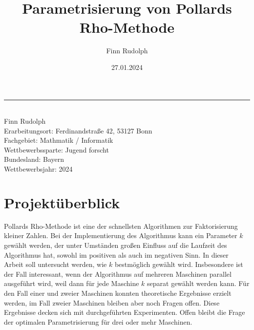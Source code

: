 \documentclass[a4paper, 10pt, ngerman]{article}
\title{Parametrisierung von Pollards Rho-Methode}
\author{Finn Rudolph}
\date{27.01.2024}
\begin{document}
\begin{titlepage}

    \noindent\rule{\textwidth}{0.4pt}

    \makeatletter
    \begin{flushleft}
        \textbf{\LARGE{\@title}} \\
        \vspace{1.5em}
        Finn Rudolph \\
        \vspace{1em}
        Erarbeitungsort: Ferdinandstraße 42, 53127 Bonn \\
        Fachgebiet: Mathmatik / Informatik \\
        Wettbewerbssparte: Jugend forscht \\
        Bundesland: Bayern \\
        Wettbewerbsjahr: 2024
    \end{flushleft}

    \vspace{0.5em}

    \section*{Projektüberblick}

    Pollards Rho-Methode ist eine der schnellsten Algorithmen zur Faktorisierung kleiner Zahlen. Bei der Implementierung des Algorithmus kann ein Parameter $k$ gewählt werden, der unter Umständen großen Einfluss auf die Laufzeit des Algorithmus hat, sowohl im positiven als auch im negativen Sinn. In dieser Arbeit soll untersucht werden, wie $k$ bestmöglich gewählt wird. Insbesondere ist der Fall interessant, wenn der Algorithmus auf mehreren Maschinen parallel ausgeführt wird, weil dann für jede Maschine $k$ separat gewählt werden kann. Für den Fall einer und zweier Maschinen konnten theoretische Ergebnisse erzielt werden, im Fall zweier Maschinen bleiben aber noch Fragen offen. Diese Ergebnisse decken sich mit durchgeführten Experimenten. Offen bleibt die Frage der optimalen Parametrisierung für drei oder mehr Maschinen.

    \vspace{1em}

    \begin{spacing}{1.2}
        \tableofcontents
    \end{spacing}

    \thispagestyle{empty}

\end{titlepage}
\end{document}
